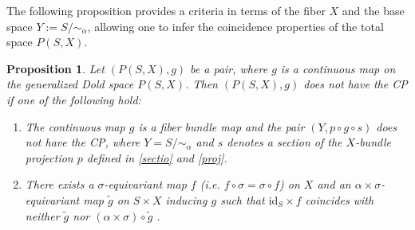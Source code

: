 \documentclass{amsart}
\newtheorem{proposition}[theorem]{Proposition}
\newcommand{\subsecref}[1]{Subsection~\ref{#1}}
\begin{document}
	
	 The following proposition provides a criteria in terms of the fiber $X$ and the base space $Y := S/\!\!\sim_\alpha$, allowing one to infer the coincidence properties of the total space $P(S,X)$.
	
	
	
	\begin{proposition}\label{necessary condition}
		Let $(P(S,X),g)$ be a pair, where $g$ is a continuous map on the generalized Dold space $P(S,X)$. Then $(P(S,X),g)$ does not have the CP if one of the following %
hold:
		\begin{enumerate}
			\item The continuous map $g$ is a fiber bundle map and the pair $(Y,p \circ g \circ s)$ does not %
have the CP, 
			where $Y = S/\!\!\sim_\alpha$ and $s$ denotes a section of the $X$-bundle projection $p$ defined in \eqref{sectio} %
and \eqref{proj}.
			
			\item  
			There exists a $\sigma$-equivariant map $f$ (i.e. $f\circ\sigma =\sigma\circ f$) on $X$ and an $\alpha \times \sigma$-equivariant map %
$\tilde g$ on $S\times X$ inducing $g$ such that
			$\mathrm{id}_S \times f$ coincides with neither $\tilde{g}$ nor
			$(\alpha \times \sigma) \circ \tilde{g}$%
.
		\end{enumerate}
		
		
		
	\end{proposition}
\end{document}
